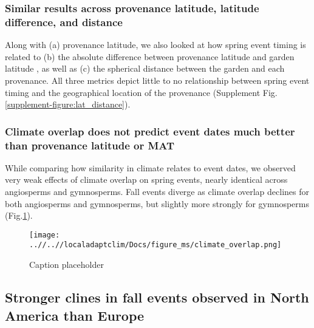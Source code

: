 \documentclass{article}
\begin{document}
\newpage

\subsubsection {Similar results across provenance latitude, latitude difference, and distance}
Along with (a) provenance latitude, we also looked at how spring event timing is related to (b) the absolute difference between provenance latitude and garden latitude , as well as (c) the spherical distance between the garden and each provenance. All three metrics depict little to no relationship between spring event timing and the geographical location of the provenance (Supplement Fig.\ref{supplement-figure:lat_distance}).

\newpage
\subsubsection {Climate overlap does not predict event dates much better than provenance latitude or MAT}

While comparing how similarity in climate relates to event dates, we observed very weak effects of climate overlap on spring events, nearly identical across angiosperms and gymnosperms. Fall events diverge as climate overlap declines for both angiosperms and gymnosperms, but slightly more strongly for gymnosperms (Fig.\ref{figure:overlap}).

\begin{figure}[!h] 
    \centering
 \texttt{[image: ..//..//localadaptclim/Docs/figure\_ms/climate\_overlap.png]}
    \caption{Caption placeholder}
    \label{figure:overlap}
\end{figure}


\subsection{Stronger clines in fall events observed in North America than Europe}




\end{document}
